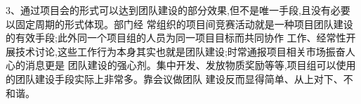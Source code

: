 \documentclass[11pt]{article}
\begin{document}
\begin{comment}
这个问题和刚才的非常类似。紧密协作有很多方法。每一个都有它的特殊用途。周例会是项目的主要骨干
  一起在场,对于传递项目信息,是最有效的。可惜我们的文化,比如不爱如实表达情况,让例会变得形式化。有
  些人认为如果项目经理非常清楚每一位员工的任务进展情况,就不需要几个骨干一起在谈一遍。其实我们不了解
  人的组合的特征。可能我们现在利用的不好,例会暂时不能发挥它应有的作用。如果要有效发挥例会的作用,我
  们需要有主导会议的能力。这个我们很缺,理会低效我一点都不出奇。问题还是在于,我们是否需要提高自己的
  管理能力。如果我们觉得我们是足够的,那么就当然不会想到要提高。

  要知道自己是否足够,只能通过效能指标。但是这个指标的X很多,我们都很容易找到不是自己的不足做成的低效。
  其实我们如果关心团队的效率,我们就不会试图证明我们不是低效的原因!我们就会积极保证我们是高效的。这
  是两个非常不同的态度。

  到底例会开的最好的时候,是什么样的境界呢?例会开完之后,大家都有一种新的理解,自己的任务在项目
  里,对比其他的同事任务,得相对情况,从而知道如何相互配合。这是一种团队的感觉。这跟其他的团队建设活
  动不一样。这个根植于项目的共同工作。而且是单对单或是小组讨论所不能提供的。我要说明一下,理会通常都
  是小组的,人数不会太多,否则效果很难体现。

  到底这些效果,是否需要,是否值得,当然要看项目的实际情况,包括项目经理是否能够把例会控制到可以达到
  一些例会的目标。但是不能达到,跟不可能达到是不一样的。过程改进就是有一个比现在强的愿境,然后努力地
  去改进、提高,去达到它。
\end{comment}

\begin{myquote}
3、通过项目会的形式可以达到团队建设的部分效果,但不是唯一手段,且没有必要以固定周期的形式体现。部门经
常组织的项目间竞赛活动就是一种项目团队建设的有效手段;此外同一个项目组的人员为同一项目目标而共同协作
工作、经常性开展技术讨论,这些工作行为本身其实也就是团队建设;时常通报项目相关市场振奋人心的消息更是
团队建设的强心剂。集中开发、发放物质奖励等等,项目组可以使用的团队建设手段实际上非常多。靠会议做团队
建设反而显得简单、从上对下、不和谐。
\end{myquote}

\begin{comment}

  我上面提到的例会的境界,其实是说明了这些活动的分别。他们不能相互替代。当然,不是每一个活动都一定要
  有,最低限度不易定要经常发生。但是如果选择例会,就需要是``例''会,效果才可以体现。从这个方面,大家
  也可以考虑考虑为什么例会可能有效。

  上面的论调,我的感觉是自己已经不愿意去做,就找到一些理由。而不是我们有哪些问题,然后考虑这个是否一
  个解决问题的方法。
\end{comment}
\end{document}

